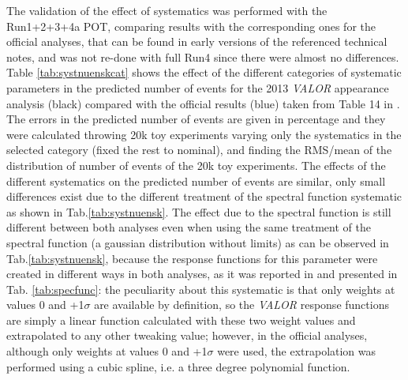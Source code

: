 The validation of the effect of systematics was performed with the Run1+2+3+4a POT, comparing results with the corresponding ones for the official analyses, that can be found in early versions of the referenced technical notes, and was not re-done with full Run4 since there were almost no differences. Table \ref{tab:systnuenskcat} shows the effect of the different categories of systematic parameters in the predicted number of events for the 2013 {\em VALOR} appearance analysis (black) compared with the official results (blue) taken from Table 14 in \cite{2013nueptheta}. The errors in the predicted number of events are given in percentage and they were calculated throwing 20k toy experiments varying only the systematics in the selected category (fixed the rest to nominal), and finding the RMS/mean of the distribution of number of events of the 20k toy experiments. The effects of the different systematics on the predicted number of events are similar, only small differences exist due to the different treatment of the spectral function systematic as shown in Tab.\ref{tab:systnuensk}. The effect due to the spectral function is still different between both analyses even when using the same treatment of the spectral function (a gaussian distribution without limits) as can be observed in Tab.\ref{tab:systnuensk}, because the response functions for this parameter were created in different ways in both analyses, as it was reported in \cite{OAtalk21nov} and presented in Tab. \ref{tab:specfunc}: the peculiarity about this systematic is that only weights at values 0 and +1$\sigma$ are available by definition, so the {\em VALOR} response functions are simply a linear function calculated with these two weight values and extrapolated to any other tweaking value; however, in the official analyses, although only weights at values 0 and +1$\sigma$ were used, the extrapolation was performed using a cubic spline, i.e. a three degree polynomial function. 


